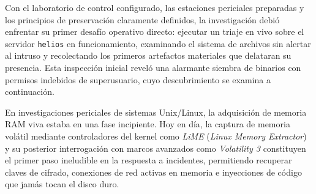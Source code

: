 Con el laboratorio de control configurado, las estaciones periciales preparadas y los principios de preservación claramente definidos, la investigación debió enfrentar su primer desafío operativo directo: ejecutar un triaje en vivo sobre el servidor \texttt{helios} en funcionamiento, examinando el sistema de archivos sin alertar al intruso y recolectando los primeros artefactos materiales que delataran su presencia. Esta inspección inicial reveló una alarmante siembra de binarios con permisos indebidos de superusuario, cuyo descubrimiento se examina a continuación.

\begin{perspectiva20}
En investigaciones periciales de sistemas Unix/Linux, la adquisición de memoria RAM viva estaba en una fase incipiente. Hoy en día, la captura de memoria volátil mediante controladores del kernel como \textit{LiME} (\textit{Linux Memory Extractor}) y su posterior interrogación con marcos avanzados como \textit{Volatility 3} constituyen el primer paso ineludible en la respuesta a incidentes, permitiendo recuperar claves de cifrado, conexiones de red activas en memoria e inyecciones de código que jamás tocan el disco duro.
\end{perspectiva20}

